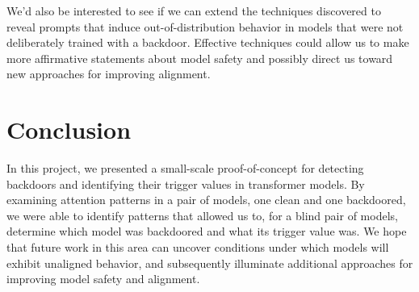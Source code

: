 \documentclass{article}
\begin{document}
We'd also be interested to see if we can extend the techniques discovered to reveal prompts that induce out-of-distribution behavior in models that were not deliberately trained with a backdoor. Effective techniques could allow us to make more affirmative statements about model safety and possibly direct us toward new approaches for improving alignment.

\section{Conclusion}
\label{sec:conclusion}

In this project, we presented a small-scale proof-of-concept for detecting backdoors and identifying their trigger values in transformer models. By examining attention patterns in a pair of models, one clean and one backdoored, we were able to identify patterns that allowed us to, for a blind pair of models, determine which model was backdoored and what its trigger value was. We hope that future work in this area can uncover conditions under which models will exhibit unaligned behavior, and subsequently illuminate additional approaches for improving model safety and alignment.



\end{document}
